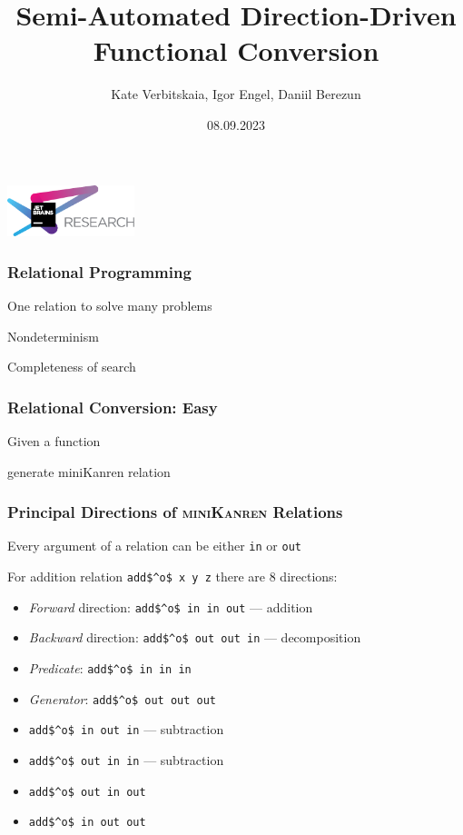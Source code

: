 \documentclass[xcolor=table]{beamer}
\title[Functional Conversion for microKanren]{Semi-Automated Direction-Driven Functional Conversion}
\institute[JetBrains Research]{
JetBrains Research, Programming Languages and Tools Lab

\vspace{1cm}

miniKanren workshop @ ICFP 2023
}
\author[Kate, Igor]{Kate Verbitskaia, Igor Engel, Daniil Berezun}
\date{08.09.2023}
\newcommand{\mk}{\textsc{miniKanren}\xspace}
\begin{document}
{
\begin{frame}[fragile]
   \begin{center}
      \includegraphics[height=1.5cm]{pictures/jetbrainsResearch.pdf}
    \end{center}
  \titlepage
\end{frame}
 }


\begin{frame}[fragile]
  \frametitle{Relational Programming}
\begin{center}
One relation to solve many problems
\end{center}

\begin{center}
Nondeterminism
\end{center}

\begin{center}
Completeness of search
\end{center}

\end{frame}

\begin{frame}[fragile]
  \frametitle{Relational Conversion: Easy}
Given a function


generate miniKanren relation

\end{frame}


\begin{frame}[fragile]
  \frametitle{Principal Directions of \mk Relations}
\begin{center}
  Every argument of a relation can be either \lstinline{in} or \lstinline{out}
\end{center}

\begin{center}
  For addition relation \lstinline{add$^o$ x y z} there are 8 directions:
\end{center}

\begin{itemize}
  \item \emph{Forward} direction: \lstinline{add$^o$ in in out} --- addition
  \item \emph{Backward} direction: \lstinline{add$^o$ out out in} --- decomposition
  \item \emph{Predicate}: \lstinline{add$^o$ in in in}
  \item \emph{Generator}: \lstinline{add$^o$ out out out}
  \item \lstinline{add$^o$ in out in} --- subtraction
  \item \lstinline{add$^o$ out in in} --- subtraction
  \item \lstinline{add$^o$ out in out}
  \item \lstinline{add$^o$ in out out}
\end{itemize}
\end{frame}
\end{document}
